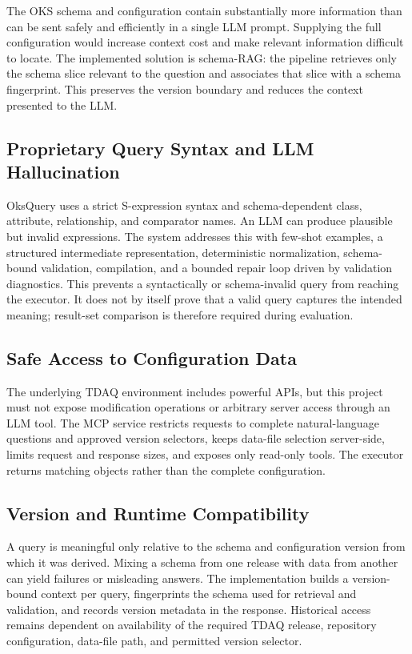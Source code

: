 \documentclass[12pt, a4paper]{report}
\begin{document}
The OKS schema and configuration contain substantially more information than can be sent safely and efficiently in a single LLM prompt. Supplying the full configuration would increase context cost and make relevant information difficult to locate. The implemented solution is schema-RAG: the pipeline retrieves only the schema slice relevant to the question and associates that slice with a schema fingerprint. This preserves the version boundary and reduces the context presented to the LLM.

\subsection{Proprietary Query Syntax and LLM Hallucination}

OksQuery uses a strict S-expression syntax and schema-dependent class, attribute, relationship, and comparator names. An LLM can produce plausible but invalid expressions. The system addresses this with few-shot examples, a structured intermediate representation, deterministic normalization, schema-bound validation, compilation, and a bounded repair loop driven by validation diagnostics. This prevents a syntactically or schema-invalid query from reaching the executor. It does not by itself prove that a valid query captures the intended meaning; result-set comparison is therefore required during evaluation.

\subsection{Safe Access to Configuration Data}

The underlying TDAQ environment includes powerful APIs, but this project must not expose modification operations or arbitrary server access through an LLM tool. The MCP service restricts requests to complete natural-language questions and approved version selectors, keeps data-file selection server-side, limits request and response sizes, and exposes only read-only tools. The executor returns matching objects rather than the complete configuration.

\subsection{Version and Runtime Compatibility}

A query is meaningful only relative to the schema and configuration version from which it was derived. Mixing a schema from one release with data from another can yield failures or misleading answers. The implementation builds a version-bound context per query, fingerprints the schema used for retrieval and validation, and records version metadata in the response. Historical access remains dependent on availability of the required TDAQ release, repository configuration, data-file path, and permitted version selector.
\end{document}

